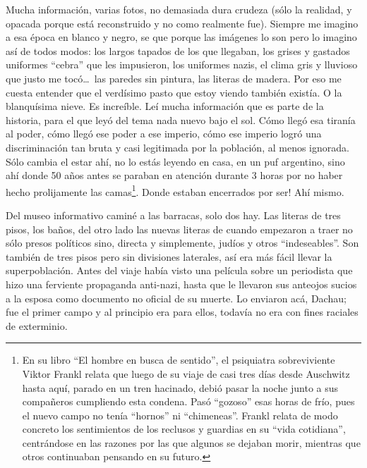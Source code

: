 Mucha informaci\'on, varias fotos, no demasiada dura crudeza (s\'olo la
realidad, y opacada porque est\'a reconstruido y no como realmente fue).
Siempre me imagino a esa \'epoca en blanco y negro, se que porque las
im\'agenes lo son pero lo imagino as\'i de todos modos: los largos tapados de
los que llegaban, los grises y gastados uniformes ``cebra'' que les
impusieron, los uniformes nazis, el clima gris y lluvioso que justo me
toc\'o\ldots\ las paredes sin pintura, las literas de madera. Por eso me
cuesta entender que el verd\'isimo pasto que estoy viendo tambi\'en exist\'ia.
O la blanqu\'isima nieve. Es incre\'ible. Le\'i mucha informaci\'on que es
parte de la historia, para el que ley\'o del tema nada nuevo bajo el sol.
C\'omo lleg\'o esa tiran\'ia al poder, c\'omo lleg\'o ese poder a ese imperio,
c\'omo ese imperio logr\'o una discriminaci\'on tan bruta y casi legitimada
por la poblaci\'on, al menos ignorada. S\'olo cambia el estar ah\'i, no lo
est\'as leyendo en casa, en un puf argentino, sino ah\'i donde 50 a\~nos antes
se paraban en atenci\'on durante 3 horas por no haber hecho prolijamente las
camas\protect\footnote{En su libro ``El hombre en busca de sentido'', el
psiquiatra sobreviviente Viktor Frankl relata que luego de su viaje de casi
tres d\'ias desde Auschwitz hasta aqu\'i, parado en un tren hacinado, debi\'o
pasar la noche junto a sus compa\~neros cumpliendo esta condena. Pas\'o
``gozoso'' esas horas de fr\'io, pues el nuevo campo no ten\'ia ``hornos'' ni
``chimeneas''. Frankl relata de modo concreto los sentimientos de los reclusos
y guardias en su ``vida cotidiana'', centr\'andose en las razones por las que
algunos se dejaban morir, mientras que otros continuaban pensando en su
futuro.}. \textexclamdown Donde estaban encerrados por ser! Ah\'i mismo.

Del museo informativo camin\'e a las barracas, solo dos hay. Las literas de
tres pisos, los ba\~nos, del otro lado las nuevas literas de cuando empezaron
a traer no s\'olo presos pol\'iticos sino, directa y simplemente, jud\'ios y
otros ``indeseables''. Son tambi\'en de tres pisos pero sin divisiones
laterales, as\'i era m\'as f\'acil llevar la superpoblaci\'on. Antes del viaje
hab\'ia visto una pel\'icula sobre un periodista que hizo una ferviente
propaganda anti-nazi, hasta que le llevaron sus anteojos sucios a la esposa
como documento no oficial de su muerte. Lo enviaron ac\'a, Dachau; fue el
primer campo y al principio era para ellos, todav\'ia no era con fines
raciales de exterminio.

